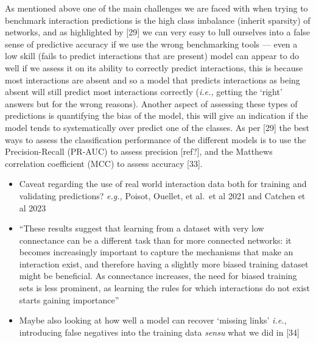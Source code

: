 \documentclass[
]{article}
\begin{document}
As mentioned above one of the main challenges we are faced with when
trying to benchmark interaction predictions is the high class imbalance
(inherit sparsity) of networks, and as highlighted by {[}29{]} we can
very easy to lull ourselves into a false sense of predictive accuracy if
we use the wrong benchmarking tools --- even a low skill (fails to
predict interactions that are present) model can appear to do well if we
assess it on its ability to correctly predict interactions, this is
because most interactions are absent and so a model that predicts
interactions as being absent will still predict most interactions
correctly (\emph{i.e.,} getting the `right' answers but for the wrong
reasons). Another aspect of assessing these types of predictions is
quantifying the bias of the model, this will give an indication if the
model tends to systematically over predict one of the classes. As per
{[}29{]} the best ways to assess the classification performance of the
different models is to use the Precision-Recall (PR-AUC) to assess
precision {[}ref?{]}, and the Matthews correlation coefficient (MCC) to
assess accuracy {[}33{]}.

\begin{itemize}
\item
  Caveat regarding the use of real world interaction data both for
  training and validating predictions? \emph{e.g.,} Poisot, Ouellet, et
  al.~et al 2021 and Catchen et al 2023
\item
  ``These results suggest that learning from a dataset with very low
  connectance can be a different task than for more connected networks:
  it becomes increasingly important to capture the mechanisms that make
  an interaction exist, and therefore having a slightly more biased
  training dataset might be beneficial. As connectance increases, the
  need for biased training sets is less prominent, as learning the rules
  for which interactions do not exist starts gaining importance''
\item
  Maybe also looking at how well a model can recover `missing links'
  \emph{i.e.,} introducing false negatives into the training data
  \emph{sensu} what we did in {[}34{]}
\end{itemize}
\end{document}
